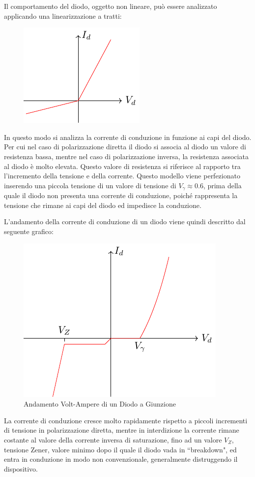\documentclass{article}
\numberwithin{equation}{subsection}
\begin{document}
Il comportamento del diodo, oggetto non lineare, può essere analizzato applicando una linearizzazione a tratti:
\begin{figure}[H]%
    \centering
    \includegraphics{diodo-linearizzazione.pdf}%
    \label{fig:diodo-linearizzazione}
\end{figure}
In questo modo si analizza la corrente di conduzione in funzione ai capi del diodo. 
Per cui nel caso di polarizzazione diretta il diodo si associa al diodo un valore di resistenza bassa, mentre nel caso di polarizzazione inversa, la 
resistenza associata al diodo è molto elevata. Questo valore di resistenza si riferisce al rapporto tra l'incremento della tensione e della corrente. 
Questo modello viene perfezionato inserendo una piccola tensione di un valore di tensione di $V_{\gamma}\approx0.6$, prima della quale il diodo non 
presenta una corrente di conduzione, poiché rappresenta la tensione che rimane ai capi del diodo ed impedisce la conduzione. 

L'andamento della corrente di conduzione di un diodo viene quindi descritto dal seguente grafico: 
\begin{figure}[H]%
    \centering
    \includegraphics{andamento-diodo.pdf}%
    \caption{Andamento Volt-Ampere di un Diodo a Giunzione}
    \label{fig:andamento-diodo}
\end{figure}
La corrente di conduzione cresce molto rapidamente rispetto a piccoli incrementi di tensione in polarizzazione diretta, mentre in interdizione 
la corrente rimane costante al valore della corrente inversa di saturazione, fino ad un valore $V_Z$, tensione Zener, valore minimo dopo il quale il 
diodo vada in ``breakdown", ed entra in conduzione in modo non convenzionale, generalmente distruggendo il dispositivo. 
\end{document}

